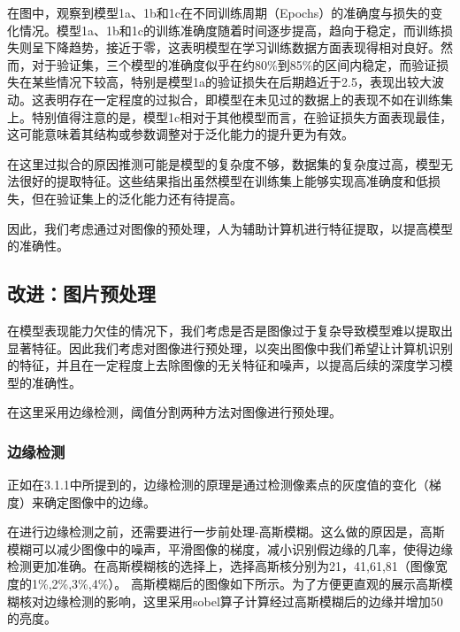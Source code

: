 在图中，观察到模型1a、1b和1c在不同训练周期（Epochs）的准确度与损失的变化情况。模型1a、1b和1c的训练准确度随着时间逐步提高，趋向于稳定，而训练损失则呈下降趋势，接近于零，这表明模型在学习训练数据方面表现得相对良好。然而，对于验证集，三个模型的准确度似乎在约80\%到85\%的区间内稳定，而验证损失在某些情况下较高，特别是模型1a的验证损失在后期趋近于2.5，表现出较大波动。这表明存在一定程度的过拟合，即模型在未见过的数据上的表现不如在训练集上。特别值得注意的是，模型1c相对于其他模型而言，在验证损失方面表现最佳，这可能意味着其结构或参数调整对于泛化能力的提升更为有效。

在这里过拟合的原因推测可能是模型的复杂度不够，数据集的复杂度过高，模型无法很好的提取特征。这些结果指出虽然模型在训练集上能够实现高准确度和低损失，但在验证集上的泛化能力还有待提高。

因此，我们考虑通过对图像的预处理，人为辅助计算机进行特征提取，以提高模型的准确性。

\FloatBarrier


\subsection{改进：图片预处理}

在模型表现能力欠佳的情况下，我们考虑是否是图像过于复杂导致模型难以提取出显著特征。因此我们考虑对图像进行预处理，以突出图像中我们希望让计算机识别的特征，并且在一定程度上去除图像的无关特征和噪声，以提高后续的深度学习模型的准确性。


在这里采用边缘检测，阈值分割两种方法对图像进行预处理。


\subsubsection{边缘检测}

正如在3.1.1中所提到的，边缘检测的原理是通过检测像素点的灰度值的变化（梯度）来确定图像中的边缘。

在进行边缘检测之前，还需要进行一步前处理-高斯模糊。这么做的原因是，高斯模糊可以减少图像中的噪声，平滑图像的梯度，减小识别假边缘的几率，使得边缘检测更加准确。\cite{4.3}在高斯模糊核的选择上，选择高斯核分别为21，41,61,81（图像宽度的1\%,2\%,3\%,4\%）。
高斯模糊后的图像如下所示。为了方便更直观的展示高斯模糊核对边缘检测的影响，这里采用sobel算子计算经过高斯模糊后的边缘并增加50的亮度。


